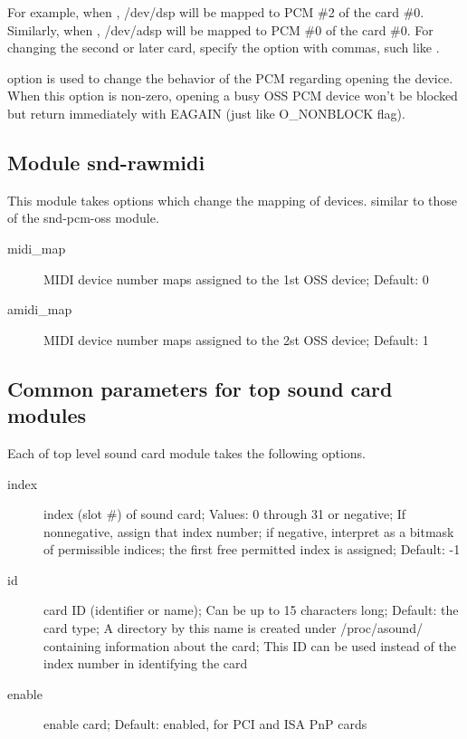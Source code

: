 \documentclass[a4paper,8pt,english]{sphinxmanual}
\begin{document}
For example, when , /dev/dsp will be mapped to PCM \#2 of
the card \#0.  Similarly, when , /dev/adsp will be mapped
to PCM \#0 of the card \#0.
For changing the second or later card, specify the option with
commas, such like .

 option is used to change the behavior of the PCM
regarding opening the device.  When this option is non-zero,
opening a busy OSS PCM device won't be blocked but return
immediately with EAGAIN (just like O\_NONBLOCK flag).


\subsection{Module snd-rawmidi}
\label{sound/alsa-configuration:module-snd-rawmidi}
This module takes options which change the mapping of devices.
similar to those of the snd-pcm-oss module.
\begin{description}
\item[{midi\_map}] \leavevmode
MIDI device number maps assigned to the 1st OSS device;
Default: 0

\item[{amidi\_map}] \leavevmode
MIDI device number maps assigned to the 2st OSS device;
Default: 1

\end{description}


\subsection{Common parameters for top sound card modules}
\label{sound/alsa-configuration:common-parameters-for-top-sound-card-modules}
Each of top level sound card module takes the following options.
\begin{description}
\item[{index}] \leavevmode
index (slot \#) of sound card;
Values: 0 through 31 or negative;
If nonnegative, assign that index number;
if negative, interpret as a bitmask of permissible indices;
the first free permitted index is assigned;
Default: -1

\item[{id}] \leavevmode
card ID (identifier or name);
Can be up to 15 characters long;
Default: the card type;
A directory by this name is created under /proc/asound/
containing information about the card;
This ID can be used instead of the index number in
identifying the card

\item[{enable}] \leavevmode
enable card;
Default: enabled, for PCI and ISA PnP cards

\end{description}
\end{document}
